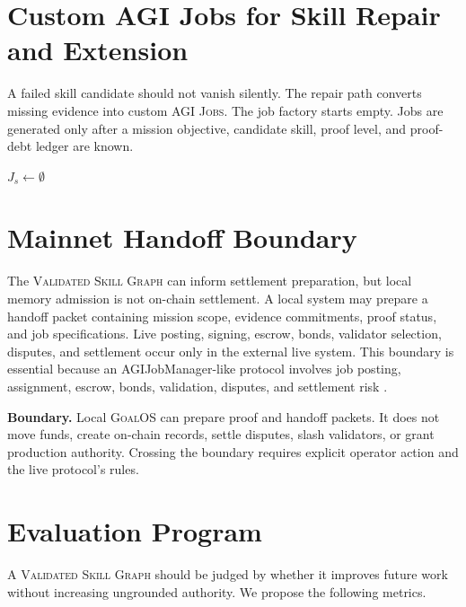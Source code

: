 \documentclass[10.5pt]{article}
\theoremstyle{goThm}
\newcommand{\vsg}{\textsc{Validated Skill Graph}}
\newcommand{\goalos}{\textsc{GoalOS}}
\newcommand{\jobs}{\textsc{AGI Jobs}}
\begin{document}
\section{Custom AGI Jobs for Skill Repair and Extension}
A failed skill candidate should not vanish silently. The repair path converts missing evidence into custom \jobs{}. The job factory starts empty. Jobs are generated only after a mission objective, candidate skill, proof level, and proof-debt ledger are known.

\begin{algorithm}[H]
\DontPrintSemicolon
\SetAlgoLined
{}
$J_s \leftarrow \emptyset$\;
\;
\caption{Skill repair job generation.}
\label{alg:repairjobs}
\end{algorithm}

\section{Mainnet Handoff Boundary}
The \vsg{} can inform settlement preparation, but local memory admission is not on-chain settlement. A local system may prepare a handoff packet containing mission scope, evidence commitments, proof status, and job specifications. Live posting, signing, escrow, bonds, validator selection, disputes, and settlement occur only in the external live system. This boundary is essential because an AGIJobManager-like protocol involves job posting, assignment, escrow, bonds, validation, disputes, and settlement risk \cite{agijobmanagerTerms}.

\begin{warningbox}
\textbf{Boundary.} Local \goalos{} can prepare proof and handoff packets. It does not move funds, create on-chain records, settle disputes, slash validators, or grant production authority. Crossing the boundary requires explicit operator action and the live protocol's rules.
\end{warningbox}

\section{Evaluation Program}
A \vsg{} should be judged by whether it improves future work without increasing ungrounded authority. We propose the following metrics.
\end{document}

